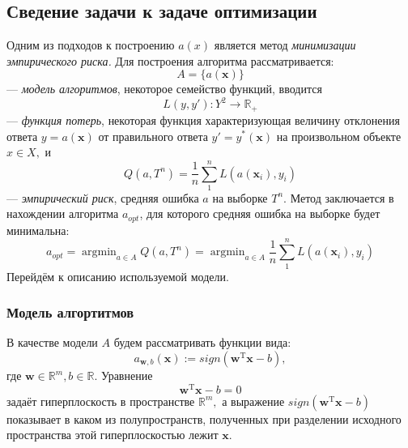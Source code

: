 \documentclass[%
bachelor,    %
subf,        %
href,        %
colorlinks,  %
]{disser}
\let\vec=\mathbf
\DeclareMathOperator*{\argmin}{argmin}
\begin{document}
\subsection{Сведение задачи к задаче оптимизации}
Одним из подходов к построению $a(x)$ является метод \textit{минимизации эмпирического риска.} Для построения алгоритма рассматривается: $$A = \{a(\vec{x})\}$$ --- \textit{модель алгоритмов}, некоторое семейство функций, вводится 
\begin{equation}\label{def:loss_function}
L(y,y'): Y^2\to \mathbb{R_+}
\end{equation} 
--- \textit{функция потерь}, некоторая функция характеризующая величину отклонения ответа $y=a(\vec{x})$ от правильного ответа $y'=y^{*}(\vec{x})$ на произвольном объекте $x \in X,$ и\\
\begin{equation}\label{def:empirical_risk} 
Q(a,T^n)= \frac{1}{n} \sum_{1}^{n}L(a(\vec{x}_i),y_i)
\end{equation} 
--- \textit{эмпирический риск}, средняя ошибка $a$ на выборке $T^n.$
Метод заключается в нахождении алгоритма $a_{opt}$, для которого средняя ошибка на выборке будет минимальна:\cite{erm}
\begin{equation}
a_{opt} = \argmin_{a \in A} Q(a,T^n) 
=\argmin_{a \in A} \frac{1}{n} \sum_{1}^{n}L(a(\vec{x}_i),y_i) 
\end{equation}
Перейдём к описанию используемой модели.

\subsubsection{Модель алгортитмов}
В качестве модели $A$ будем рассматривать функции вида:
$$a_{\vec{w},b}(\vec{x}) := sign(\vec{w}^\mathrm{T}\vec{x} - b),$$ где $\vec{w} \in \mathbb{R}^m, b \in \mathbb{R}$.
Уравнение
\begin{equation}\label{def:plane_equation}
\vec{w}^\mathrm{T}\vec{x} - b= 0
\end{equation}
задаёт гиперплоскость в пространстве $\mathbb{R}^m,$ а выражение $sign(\vec{w}^\mathrm{T}\vec{x} - b)$ показывает в каком из полупространств, полученных при разделении исходного пространства этой гиперплоскостью лежит $\vec{x}.$ 
\end{document}
